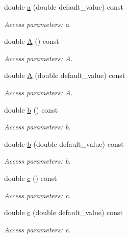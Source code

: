 \begin{DoxyCompactItemize}
double \hyperlink{struct_d_d4hep_1_1_x_m_l_1_1_dimension_a7684282299d47d6ef22c8d3b19f0e335}{a} (double default\_\-value) const 
\begin{DoxyCompactList}\small\item\em Access parameters: a. \item\end{DoxyCompactList}\item 
double \hyperlink{struct_d_d4hep_1_1_x_m_l_1_1_dimension_ad10c68417be42bec5d4c873a17c2f328}{A} () const 
\begin{DoxyCompactList}\small\item\em Access parameters: A. \item\end{DoxyCompactList}\item 
double \hyperlink{struct_d_d4hep_1_1_x_m_l_1_1_dimension_a04be03f345e521bcfa7544ae99cfbd16}{A} (double default\_\-value) const 
\begin{DoxyCompactList}\small\item\em Access parameters: A. \item\end{DoxyCompactList}\item 
double \hyperlink{struct_d_d4hep_1_1_x_m_l_1_1_dimension_a541c93dbfa23648d7a1d1b94be2547f7}{b} () const 
\begin{DoxyCompactList}\small\item\em Access parameters: b. \item\end{DoxyCompactList}\item 
double \hyperlink{struct_d_d4hep_1_1_x_m_l_1_1_dimension_ad019dd23493fbe818fa17a469ea00add}{b} (double default\_\-value) const 
\begin{DoxyCompactList}\small\item\em Access parameters: b. \item\end{DoxyCompactList}\item 
double \hyperlink{struct_d_d4hep_1_1_x_m_l_1_1_dimension_acaf9e1114462a7ae94110ca93d9c923c}{c} () const 
\begin{DoxyCompactList}\small\item\em Access parameters: c. \item\end{DoxyCompactList}\item 
double \hyperlink{struct_d_d4hep_1_1_x_m_l_1_1_dimension_a10c3a02a90ba7df601823b9b77e313b2}{c} (double default\_\-value) const 
\begin{DoxyCompactList}\small\item\em Access parameters: c. \item\end{DoxyCompactList}\item 

\end{DoxyCompactItemize}
